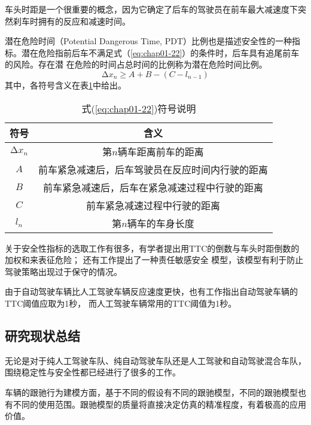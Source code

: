 车头时距是一个很重要的概念，因为它确定了后车的驾驶员在前车最大减速度下突然刹车时拥有的反应和减速时间。

潜在危险时间（Potential Dangerous Time, PDT）比例也是描述安全性的一种指标。潜在危险指前后车不满足式（\ref{eq:chap01-22}）的条件时，后车具有追尾前车的风险。存在潜
在危险的时间占总时间的比例称为潜在危险时间比例。
\begin{equation}
  \increment{x}_n \geqslant A + B - (C - l_{n-1})
  \label{eq:chap01-22}
\end{equation}
其中，各符号含义在表\ref{tab:chap01-9}中给出。
\begin{table}
  \centering
  \caption{式(\ref{eq:chap01-22})符号说明}
  \begin{tabular}{cc}
    \toprule
    符号          &  含义                         \\
    \midrule
    $\increment{x}_n$          &    第$n$辆车距离前车的距离         \\
    $A$                        &    前车紧急减速后，后车驾驶员在反应时间内行驶的距离      \\
    $B$                        &    前车紧急减速后，后车在紧急减速过程中行驶的距离      \\
    $C$                        &    前车紧急减速过程中行驶的距离      \\
    $l_n$                      &    第$n$辆车的车身长度     \\
    \bottomrule
  \end{tabular}
  \label{tab:chap01-9}
\end{table}

关于安全性指标的选取工作有很多，有学者提出用TTC的倒数与车头时距倒数的加权和来表征危险\cite{Kondoh2008iden}；
还有工作\cite{DBLP:journals/corr/abs-1708-06374}提出了一种责任敏感安全
模型，该模型有利于防止驾驶策略出现过于保守的情况。

由于自动驾驶车辆比人工驾驶车辆反应速度更快，也有工作\cite{Morando2018Studying}指出自动驾驶车辆的TTC阈值应取为1秒，
而人工驾驶车辆常用的TTC阈值为1秒。

\subsection{研究现状总结}

无论是对于纯人工驾驶车队、纯自动驾驶车队还是人工驾驶和自动驾驶混合车队，围绕稳定性与安全性都已经进行了很多的工作。

车辆的跟驰行为建模方面，基于不同的假设有不同的跟驰模型，不同的跟驰模型也有不同的使用范围。跟驰模型的质量将直接决定仿真的精准程度，有着极高的应用价值。

